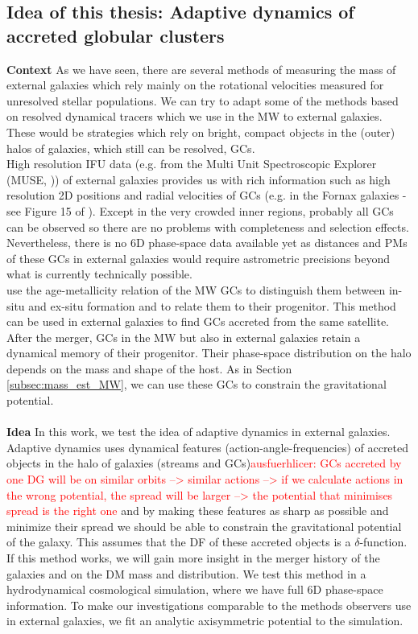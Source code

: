 \subsection{Idea of this thesis: Adaptive dynamics of accreted globular clusters}
\textbf{Context}
As we have seen, there are several methods of measuring the mass of external galaxies which rely mainly on the rotational velocities measured for unresolved stellar populations. We can try to adapt some of the methods based on resolved dynamical tracers which we use in the \ac{MW} to external galaxies. These would be strategies which rely on bright, compact objects in the (outer) halos of galaxies, which still can be resolved, \acp{GC}. 
\\
High resolution \ac{IFU} data (e.g. from the Multi Unit Spectroscopic Explorer (MUSE, \citealp{Bacon...MUSE...2010})) of external galaxies provides us with rich information such as high resolution 2D positions and radial velocities of \acp{GC} (e.g. in the Fornax galaxies - see Figure 15 of \citealp{Sarzi...Fornax3d....2018}). Except in the very crowded inner regions, probably all \acp{GC} can be observed so there are no problems with completeness and selection effects. Nevertheless, there is no 6D phase-space data available yet as distances and \acp{PM} of these \acp{GC} in external galaxies would require astrometric precisions beyond what is currently technically possible. 
\\
\citet{Leaman...agemetall.MWGCs...2013} use the age-metallicity relation of the \ac{MW} \acp{GC} to distinguish them between in-situ and ex-situ formation and to relate them to their progenitor. This method can be used in external galaxies to find \acp{GC} accreted from the same satellite.
\\
After the merger, \acp{GC} in the \ac{MW} but also in external galaxies retain a dynamical memory of their progenitor. Their phase-space distribution on the halo depends on the mass and shape of the host. As in Section \ref{subsec:mass_est_MW}, we can use these \acp{GC} to constrain the gravitational potential.
\\\\
\textbf{Idea}
In this work, we test the idea of adaptive dynamics \citep{Binney...adaptivedynamics...2005} in external galaxies. Adaptive dynamics uses dynamical features (action-angle-frequencies) of accreted objects in the halo of galaxies (streams and \acp{GC})\textcolor{red}{ausfuerhlicer: GCs accreted by one DG will be on similar orbits --> similar actions --> if we calculate actions in the wrong potential, the spread will be larger --> the potential that minimises spread is the right one} and by making these features as sharp as possible and minimize their spread we should be able to constrain the gravitational potential of the galaxy. This assumes that the \ac{DF} of these accreted objects is a $\delta$-function. If this method works, we will gain more insight in the merger history of the galaxies and on the \ac{DM} mass and distribution. We test this method in a hydrodynamical cosmological simulation, where we have full 6D phase-space information. To make our investigations comparable to the methods observers use in external galaxies, we fit an analytic axisymmetric potential to the simulation.
